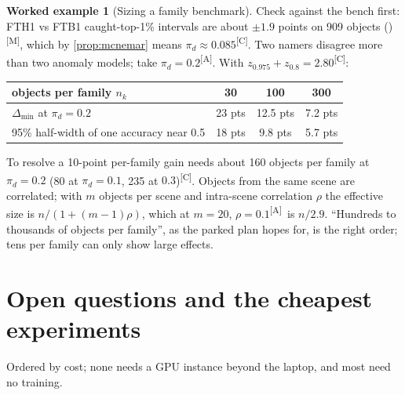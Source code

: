 \documentclass[11pt,a4paper]{article}
\theoremstyle{plain}
\theoremstyle{definition}
\newtheorem{example}[proposition]{Worked example}
\theoremstyle{remark}
\newcommand{\meas}{\textsuperscript{\textsf{\scriptsize[M]}}}
\newcommand{\comp}{\textsuperscript{\textsf{\scriptsize[C]}}}
\newcommand{\assm}{\textsuperscript{\textsf{\scriptsize[A]}}}
\begin{document}
\begin{example}[Sizing a family benchmark]
\label{ex:mde}
Check against the bench first: FTH1 vs FTB1 caught-top-1\% intervals are about $\pm1.9$ points on 909 objects
()\meas, which by \cref{prop:mcnemar} means $\pi_d\approx0.085$\comp. Two namers disagree more than
two anomaly models; take $\pi_d=0.2$\assm. With $z_{0.975}+z_{0.8}=2.80$\comp:

\begin{center}\small
\begin{tabular}{@{}lccc@{}}
\toprule
objects per family $n_k$ & 30 & 100 & 300\\
\midrule
$\Delta_{\min}$ at $\pi_d=0.2$ & 23 pts & 12.5 pts & 7.2 pts\\
95\% half-width of one accuracy near 0.5 & 18 pts & 9.8 pts & 5.7 pts\\
\bottomrule
\end{tabular}
\end{center}

To resolve a 10-point per-family gain needs about 160 objects per family at $\pi_d=0.2$ (80 at $\pi_d=0.1$, 235 at $0.3$)\comp. Objects
from the same scene are correlated; with $m$ objects per scene and intra-scene correlation $\rho$ the effective size is
$n/(1+(m-1)\rho)$, which at $m=20$, $\rho=0.1$\assm\ is $n/2.9$. ``Hundreds to thousands of objects per family'', as the parked plan
hopes for, is the right order; tens per family can only show large effects.
\end{example}

\section{Open questions and the cheapest experiments}
\label{sec:open}

Ordered by cost; none needs a GPU instance beyond the laptop, and most need no training.
\end{document}
